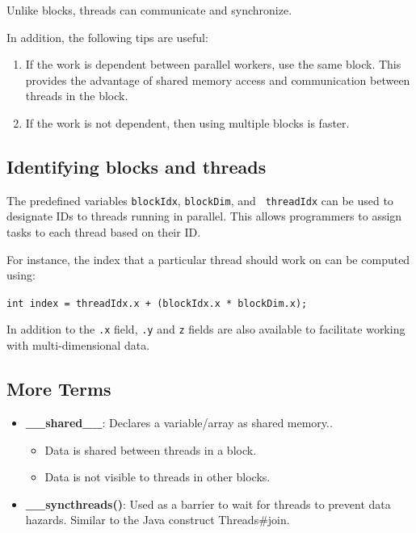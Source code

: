 \documentclass[twoside]{article}
\begin{document}
Unlike blocks, threads can communicate and synchronize.

In addition, the following tips are useful:

\begin{enumerate}
    \item If the work is dependent between parallel workers, use the same
        block. This provides the advantage of shared memory access
        and communication between threads in the block.
    \item If the work is not dependent, then using multiple blocks is
        faster.
\end{enumerate}

\subsection{Identifying blocks and threads}

The predefined variables {\tt blockIdx}, {\tt blockDim}, and {\tt
threadIdx} can be used to designate IDs to threads running in parallel. This
allows programmers to assign tasks to each thread based on their ID.

For instance, the index that a particular thread should work on can be
computed using:

\begin{center}
    {{\tt int index = threadIdx.x + (blockIdx.x * blockDim.x); }}
\end{center}

In addition to the {\tt .x} field, {\tt .y} and {\tt z} fields are also
available to facilitate working with multi-dimensional data.

\subsection{More Terms}

\begin{itemize}
    \item {\bf \_\_shared\_\_}: Declares a variable/array as shared memory..
        \begin{itemize}
            \item Data is shared between threads in a block.
            \item Data is not visible to threads in other blocks.
        \end{itemize}
    \item {\bf \_\_syncthreads()}: Used as a barrier to wait for threads to prevent data
        hazards. Similar to the Java construct Threads#join.
\end{itemize}
\end{document}
